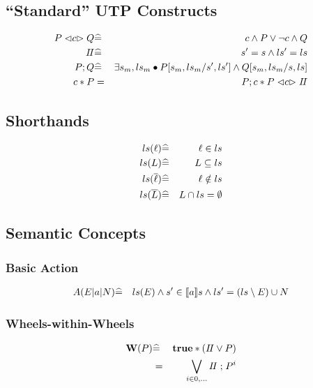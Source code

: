 \subsection{``Standard'' UTP Constructs}

\begin{eqnarray*}
   P \mathrel{\lhd{c}\rhd} Q
   &\widehat=&
   c \land P \lor \lnot c \land Q
\\ I\!I
   &\widehat=&
   s'= s \land ls'=ls
\\ P ; Q
   &\widehat=&
   \exists s_m,ls_m \bullet P[s_m,ls_m/s',ls'] \land Q[s_m,ls_m/s,ls]
\\ c * P
   &=&
   P ; c * P \mathrel{\lhd{c}\rhd} I\!I
\end{eqnarray*}

\subsection{Shorthands}

\begin{eqnarray*}
   ls(\ell) &\widehat=& \ell \in ls
\\ ls(L) &\widehat=& L \subseteq ls
\\ ls(\overline{\ell}) &\widehat=& \ell \notin ls
\\ ls(\overline{L}) &\widehat=& L \cap ls = \emptyset
\end{eqnarray*}

\subsection{Semantic Concepts}

\subsubsection{Basic Action}

\begin{eqnarray*}
   A(E|a|N)
   &\widehat=&
   ls(E) \land s' \in [\![{a}]\!] s \land ls'=(ls\setminus E) \cup N
\end{eqnarray*}


\subsubsection{Wheels-within-Wheels}

\begin{eqnarray*}
   \mathbf{W}(P) &\widehat=& \mathbf{true} * (I\!I \lor P)
\\         &  =  & \bigvee_{i \in 0,\dots} I\!I \mathrel{;} P^i
\end{eqnarray*}

